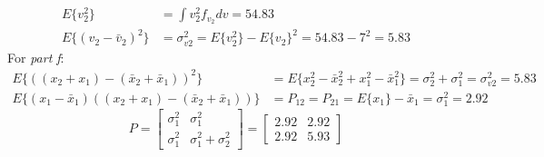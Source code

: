 \documentclass[11pt]{article}
\begin{document}
\begin{enumerate}[label=\textbf{\arabic*.}]
\begin{equation*}
\begin{split}
      E\{v_2^2\} &= \int v_2^2f_{v_2}dv = 54.83 \\
      E\{(v_2-\bar{v}_2)^2\} &= \sigma_{v2}^2 = E\{v_2^2\} - E\{v_2\}^2 = 54.83 - 7^2 = 5.83
    \end{split}
  \end{equation*}
  For \emph{part f}:
  \begin{equation*}
    \begin{split}
      E\{((x_2+x_1)-(\bar{x}_2+\bar{x}_1))^2\} &= E\{x_2^2-\bar{x}_2^2+x_1^2-\bar{x}_1^2\}= \sigma_2^2 + \sigma_1^2 = \sigma_{v2}^2 = 5.83 \\
      E\{(x_1-\bar{x}_1)((x_2+x_1)-(\bar{x}_2+\bar{x}_1))\} &= P_{12} = P_{21} = E\{x_1\} - \bar{x}_1 = \sigma_1^2 = 2.92
    \end{split}
  \end{equation*}
  \begin{equation*}
    P = 
    \begin{bmatrix} 
      \sigma_1^2 & \sigma_1^2 \\ \sigma_1^2 & \sigma_1^2+\sigma_2^2
    \end{bmatrix}
    =
    \begin{bmatrix}
      2.92 & 2.92 \\ 2.92 & 5.93
    \end{bmatrix}
  \end{equation*}


\end{enumerate}
\end{document}
